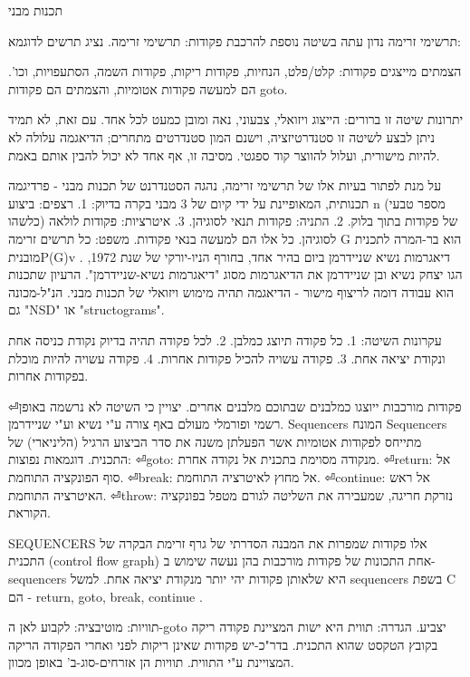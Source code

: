         תכנות מבני

        תרשימי זרימה
        נדון עתה בשיטה נוספת להרכבת פקודות: תרשימי זרימה. נציג תרשים לדוגמא:

        הצמתים מייצגים פקודות: קלט/פלט, הנחיות, פקודות ריקות, פקודות השמה, הסתעפויות, וכו'. הם למעשה פקודות אטומיות, והצמתים הם פקודות goto.

        יתרונות שיטה זו ברורים: הייצוג ויזואלי, צבעוני, נאה ומובן כמעט לכל אחד. עם זאת, לא תמיד ניתן לבצע לשיטה זו סטנדרטיזציה, וישנם המון סטנדרטים מתחרים; הדיאגמה עלולה לא להיות מישורית, ועלול להווצר קוד ספגטי. מסיבה זו, אף אחד לא יכול להבין אותם באמת.

        על מנת לפתור בעיות אלו של תרשימי זרימה, נהגה הסטנדרנט של תכנות מבני - פרדיגמה תכנותית, המאופיינת על ידי קיום של 3 מבני בקרה בדיוק:
        1. רצפים: ביצוע n (מספר טבעי כלשהו) של פקודות בתוך בלוק.
        2. התניה: פקודות תנאי לסוגיהן.
        3. איטרציות: פקודות לולאה לסוגיהן.
        כל אלו הם למעשה בנאי פקודות.
        משפט: כל תרשים זרימה G הוא בר-המרה לתכנית מובניתP(G)v .
        דיאגרמות נשיא שניידרמן
        ביום בהיר אחד, בחורף הניו-יורקי של שנת 1972, הגו יצחק נשיא ובן שניידרמן את הדיאגרמות מסוג "דיאגרמות נשיא-שניידרמן". הרעיון שתכנות הוא עבודה דומה לריצוף מישור - הדיאגמה תהיה מימוש ויזואלי של תכנות מבני. הנ"ל-מכונה גם "NSD" או "structograms".

        עקרונות השיטה:
        1. כל פקודה תיוצג כמלבן.
        2. לכל פקודה תהיה בדיוק נקודת כניסה אחת ונקודת יציאה אחת.
        3. פקודה עשויה להכיל פקודות אחרות.
        4. פקודה עשויה להיות מוכלת בפקודות אחרות.
        \begin{ציינון}
⏎פקודות מורכבות ייוצגו כמלבנים שבתוכם מלבנים אחרים.
        יצויין כי השיטה לא נרשמה באופן רשמי ופורמלי מעולם באף צורה ע"י נשיא וע"י שניידרמן.
        Sequencers
        המונח Sequencers מתייחס לפקודות אטומיות אשר הפעלתן משנה את סדר הביצוע הרגיל (הליניארי) של התכנית.
        דוגמאות נפוצות:
⏎goto: מנקודה מסוימת בתכנית אל נקודה אחרת.
⏎return: אל סוף הפונקציה התוחמת.
⏎break: אל מחוץ לאיטרציה התוחמת.
⏎continue: אל ראש האיטרציה התוחמת.
⏎throw: נזרקת חריגה, שמעבירה את השליטה לגורם מטפל בפונקציה הקוראת.
      \end{ציינון}

        SEQUENCERS
        אלו פקודות שמפרות את המבנה הסדרתי של גרף זרימת הבקרה של התכנית
        (control flow graph) אחת התכונות של פקודות מורכבות בהן נעשה שימוש ב-sequencers היא שלאותן פקודות יהי יותר מנקודת יציאה אחת.
        למשל sequencers בשפת C הם - return, goto, break, continue .

        תוויות:
        מוטיבציה: לקבוע לאן ה-goto יצביע.
        הגדרה: תווית היא ישות המציינת פקודה ריקה בקובץ הטקסט שהוא התכנית. בדר"כ-יש פקודות שאינן ריקות לפני ואחרי הפקודה הריקה המצויינת ע"י התווית.
        תוויות הן אזרחים-סוג-ב' באופן מכוון.

